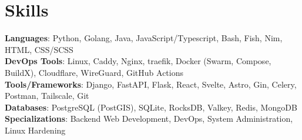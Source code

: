 \documentclass[11pt,letterpaper]{article}
\begin{document}
\section{Skills}
\small{
\textbf{Languages}{: Python, Golang, Java, JavaScript/Typescript, Bash, Fish, Nim,  HTML, CSS/SCSS} \\
\textbf{DevOps Tools}{: Linux, Caddy, Nginx, traefik, Docker (Swarm, Compose, BuildX), Cloudflare, WireGuard, GitHub Actions} \\
\textbf{Tools/Frameworks}{: Django, FastAPI, Flask, React, Svelte, Astro, Gin, Celery, Postman, Tailscale, Git} \\
\textbf{Databases}{: PostgreSQL (PostGIS), SQLite, RocksDB, Valkey, Redis, MongoDB} \\
\textbf{Specializations}{: Backend Web Development, DevOps, System Administration, Linux Hardening} \\
}
\end{document}
